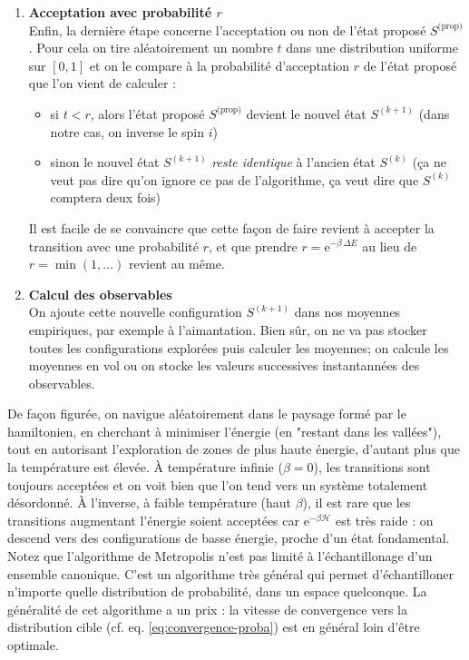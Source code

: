 \documentclass{book}
\begin{document}
\begin{enumerate}
  \item \textbf{Acceptation avec probabilité $r$}\\
  Enfin, la dernière étape concerne l'acceptation ou non de l’état proposé $S^\text{(prop)}$. Pour cela on tire aléatoirement un nombre $t$ dans une distribution uniforme sur $[0,1]$ et on le compare à la probabilité d'acceptation $r$ de l'état proposé que l’on vient de calculer :
  \begin{itemize}
    \item si $t<r$, alors l'état proposé $S^\text{(prop)}$ devient le nouvel état $S^{(k+1)}$ (dans notre cas, on inverse le spin $i$)
    \item sinon le nouvel état $S^{(k+1)}$ \emph{reste identique} à l'ancien état $S^{(k)}$ (ça ne veut pas dire qu'on ignore ce pas de l'algorithme, ça veut dire que $S^{(k)}$ comptera deux fois)
  \end{itemize}
  Il est facile de se convaincre que cette façon de faire revient à accepter la transition avec une probabilité $r$, et que prendre $r=\mathrm{e}^{-\beta\,\Delta E}$ au lieu de $r=\min(1,\dots)$ revient au même.\\

  \item \textbf{Calcul des observables}\\
  On ajoute cette nouvelle configuration $S^{(k+1)}$ dans nos moyennes empiriques, par exemple à l'aimantation. Bien sûr, on ne va pas stocker toutes les configurations explorées puis calculer les moyennes; on calcule les moyennes en vol ou on stocke les valeurs successives instantannées des observables.\\
\end{enumerate}

De façon figurée, on navigue aléatoirement dans le paysage formé par le hamiltonien, en cherchant à minimiser l'énergie (en "restant dans les vallées"), tout en autorisant l'exploration de zones de plus haute énergie, d'autant plus que la température est élevée. À température infinie ($\beta=0$), les transitions sont toujours acceptées et on voit bien que l'on tend vers un système totalement désordonné. À l'inverse, à faible température (haut $\beta$), il est rare que les transitions augmentant l'énergie soient acceptées car $\mathrm{e}^{-\beta\mathcal{H}}$ est très raide : on descend vers des configurations de basse énergie, proche d'un état fondamental.\\

Notez que l'algorithme de Metropolis n'est pas limité à l'échantillonage d'un ensemble canonique. C'est un algorithme très général qui permet d'échantilloner n'importe quelle distribution de probabilité, dans un espace quelconque. La généralité de cet algorithme a un prix : la vitesse de convergence vers la distribution cible (cf. eq. \ref{eq:convergence-proba}) est en général loin d'être optimale.
\end{document}
